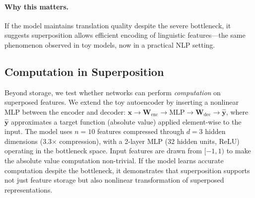 \paragraph{Why this matters.} If the model maintains translation quality despite the severe bottleneck, it suggests superposition allows efficient encoding of linguistic features---the same phenomenon observed in toy models, now in a practical NLP setting.

\subsection{Computation in Superposition}

Beyond storage, we test whether networks can perform \emph{computation} on superposed features. We extend the toy autoencoder by inserting a nonlinear MLP between the encoder and decoder: $\mathbf{x} \to \mathbf{W}_{\text{enc}} \to \text{MLP} \to \mathbf{W}_{\text{dec}} \to \hat{\mathbf{y}}$, where $\hat{\mathbf{y}}$ approximates a target function (absolute value) applied element-wise to the input. The model uses $n = 10$ features compressed through $d = 3$ hidden dimensions (3.3$\times$ compression), with a 2-layer MLP (32 hidden units, ReLU) operating in the bottleneck space. Input features are drawn from $[-1, 1)$ to make the absolute value computation non-trivial. If the model learns accurate computation despite the bottleneck, it demonstrates that superposition supports not just feature storage but also nonlinear transformation of superposed representations.

